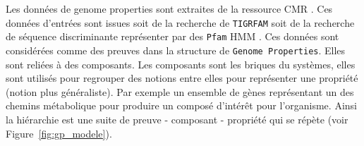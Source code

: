 \begin{refsegment}
    Les données de genome properties sont extraites de la ressource \acrfull{CMR} \cite{peterson2001comprehensive,davidsen2009comprehensive}. Ces données d'entrées sont issues soit de la recherche de \texttt{TIGRFAM} \cite{haft2003tigrfams}\label{key} soit de la recherche de séquence discriminante représenter par des \texttt{Pfam} \acrfull{HMM} \cite{bateman2000pfam,bateman2002pfam,bateman2004pfam,finn2008pfam,finn2009pfam,punta2011pfam,finn2013pfam,finn2016pfam}. Ces données sont considérées comme des preuves dans la structure de \texttt{Genome Properties}. Elles sont reliées à des composants. Les composants sont les briques du systèmes, elles sont utilisés pour regrouper des notions entre elles pour représenter une propriété (notion plus généraliste). Par exemple un ensemble de gènes représentant un des chemins métabolique pour produire un composé d'intérêt pour l'organisme. Ainsi la hiérarchie est une suite de preuve - composant - propriété qui se répète (voir Figure~\cref{fig:gp_modele}).
    

\end{refsegment}
